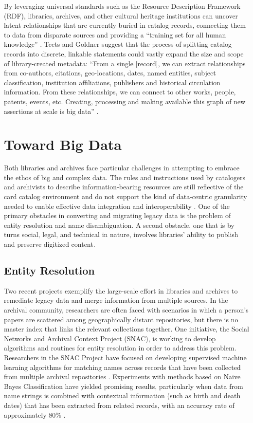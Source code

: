 \documentclass[sigconf]{acmart}
\begin{document}
By leveraging universal standards such as the Resource Description Framework (RDF), libraries, archives, and other cultural heritage institutions can uncover latent relationships that are currently buried in catalog records, connecting them to data from disparate sources and providing a ``training set for all human knowledge'' \cite[p.~430]{mT13}. Teets and Goldner suggest that the process of splitting catalog records into discrete, linkable statements could vastly expand the size and scope of library-created metadata: ``From a single [record], we can extract relationships from co-authors, citations, geo-locations, dates, named entities, subject classification, institution affiliations, publishers and historical circulation information. From these relationships, we can connect to other works, people, patents, events, etc. Creating, processing and making available this graph of new assertions at scale is big data'' \cite[p.~431]{mT13}.

\section{Toward Big Data}
Both libraries and archives face particular challenges in attempting to embrace the ethos of big and complex data. The rules and instructions used by catalogers and archivists to describe information-bearing resources are still reflective of the card catalog environment and do not support the kind of data-centric granularity needed to enable effective data integration and interoperability \cite{rT02}. One of the primary obstacles in converting and migrating legacy data is the problem of entity resolution and name disambiguation. A second obstacle, one that is by turns social, legal, and technical in nature, involves libraries' ability to publish and preserve digitized content.

\subsection{Entity Resolution}
Two recent projects exemplify the large-scale effort in libraries and archives to remediate legacy data and merge information from multiple sources. In the archival community, researchers are often faced with scenarios in which a person's papers are scattered among geographically distant repositories, but there is no master index that links the relevant collections together. One initiative, the Social Networks and Archival Context Project (SNAC), is working to develop algorithms and routines for entity resolution in order to address this problem. Researchers in the SNAC Project have focused on developing supervised machine learning algorithms for matching names across records that have been collected from multiple archival repositories \cite{rL11}. Experiments with methods based on Naive Bayes Classification have yielded promising results, particularly when data from name strings is combined with contextual information (such as birth and death dates) that has been extracted from related records, with an accuracy rate of approximately 80\% \cite{rL11}.
\end{document}
